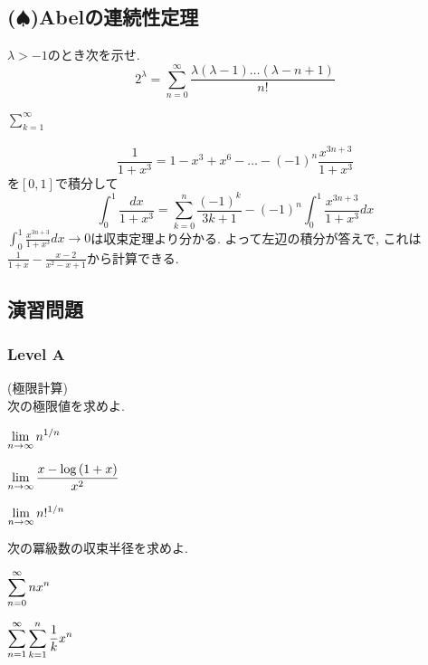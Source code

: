 \newpage
\subsection{($\spadesuit$)Abelの連続性定理}

\begin{egprob}
$\lambda > -1$のとき次を示せ.
\[2^{\lambda} = \sum_{n=0}^{\infty} \dfrac{\lambda(\lambda-1)\dots (\lambda - n + 1)}{n!}\]
\end{egprob}

\begin{egprob}
$\sum_{k=1}^{\infty} \dfrac{}{}$
\end{egprob}

\begin{egans}
\[\dfrac{1}{1+x^3} = 1 - x^3 + x^6 - \dots -(-1)^n\dfrac{x^{3n+3}}{1+x^3}\]
を$[0,1]$で積分して
\[\int_{0}^{1}\dfrac{dx}{1+x^3} = \sum_{k=0}^{n} \dfrac{(-1)^k}{3k+1} - (-1)^n \int_{0}^{1} \dfrac{x^{3n+3}}{1+x^3}dx\]
$\int_{0}^{1}\frac{x^{3n+3}}{1+x^3}dx \to 0$は収束定理より分かる. よって左辺の積分が答えで, これは$\frac{1}{1+x} - \frac{x-2}{x^2-x+1}$から計算できる.

\end{egans}




\newpage
\subsection{演習問題}
\subsubsection{Level A}
\begin{prob} (極限計算)\\
次の極限値を求めよ.
\ben
\item $\displaystyle\lim_{n\to \infty} n^{1/n}$
\item $\displaystyle\lim_{n\to \infty} \dfrac{x-\log{(1+x)}}{x^2}$
\item $\displaystyle\lim_{n\to \infty} n!^{1/n}$
\een
\end{prob}
\begin{hint}
\end{hint}
\begin{prob}
次の冪級数の収束半径を求めよ.
\ben
\item $\displaystyle\sum_{n=0}^{\infty} nx^{n}$
\item $\displaystyle\sum_{n=1}^{\infty} \displaystyle\sum_{k=1}^{n} \dfrac{1}{k} x^{n}$
\een
\end{prob}
\begin{hint}
\end{hint}

